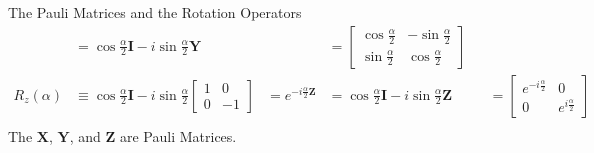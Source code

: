 \documentclass{beamer}
\begin{document}
\begin{frame}{The Pauli Matrices and the Rotation Operators\tiny\cite{rotationsonblochsphere}}
{\begin{align*}
                  &= \cos\frac{\alpha}2\mathbf{I} - i\sin\frac{\alpha}2 \mathbf{Y}
                  &&=\begin{bmatrix}
                    \cos\frac{\alpha}2 & -\sin\frac{\alpha}2 \\
                    \sin\frac{\alpha}2 & \cos\frac{\alpha}2
                    \end{bmatrix} \\
      R_z(\alpha) &\equiv \cos\frac{\alpha}2\mathbf{I} - i\sin\frac{\alpha}2
                                                                     \begin{bmatrix}
                                                                       1 & 0 \\
                                                                       0 & -1
                                                                     \end{bmatrix}
                  &= e^{-i\frac{\alpha}2\mathbf{Z}}
                  &= \cos\frac{\alpha}2\mathbf{I} - i\sin\frac{\alpha}2 \mathbf{Z}
                  &&=\begin{bmatrix}
                    e^{-i\frac{\alpha}2} & 0 \\
                    0 & e^{i\frac{\alpha}2}
                    \end{bmatrix} \\
    \end{align*}
    The $\mathbf{X}$, $\mathbf{Y}$, and $\mathbf{Z}$ are Pauli Matrices.
  }%
\end{frame}
\end{document}
